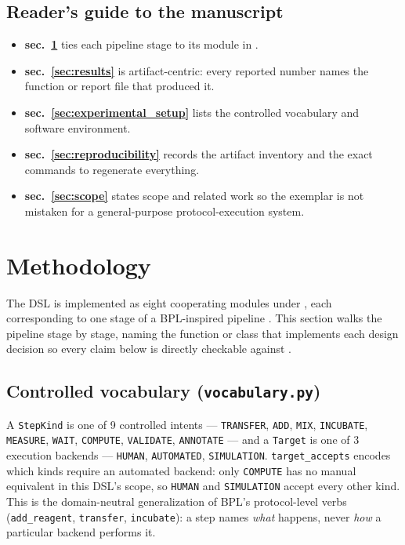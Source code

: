 \documentclass[
  english,
]{article}
\providecommand{\tightlist}{%
  \setlength{\itemsep}{0pt}\setlength{\parskip}{0pt}}
\begin{document}
\subsection{Reader's guide to the
manuscript}\label{readers-guide-to-the-manuscript}

\begin{itemize}
\tightlist
\item
  \textbf{sec.~\ref{sec:methodology}} ties each pipeline stage to its
  module in .
\item
  \textbf{sec.~\ref{sec:results}} is artifact-centric: every reported
  number names the function or report file that produced it.
\item
  \textbf{sec.~\ref{sec:experimental_setup}} lists the controlled
  vocabulary and software environment.
\item
  \textbf{sec.~\ref{sec:reproducibility}} records the artifact inventory
  and the exact commands to regenerate everything.
\item
  \textbf{sec.~\ref{sec:scope}} states scope and related work so the
  exemplar is not mistaken for a general-purpose protocol-execution
  system.
\end{itemize}

\newpage

\section{Methodology}\label{sec:methodology}

The DSL is implemented as eight cooperating modules under
, each corresponding to one stage of a
BPL-inspired pipeline \citep{bpl2026}. This section walks the pipeline
stage by stage, naming the function or class that implements each design
decision so every claim below is directly checkable against
.

\subsection{\texorpdfstring{Controlled vocabulary
(\texttt{vocabulary.py})}{Controlled vocabulary (vocabulary.py)}}\label{controlled-vocabulary-vocabulary.py}

A \texttt{StepKind} is one of 9 controlled intents ---
\texttt{TRANSFER}, \texttt{ADD}, \texttt{MIX}, \texttt{INCUBATE},
\texttt{MEASURE}, \texttt{WAIT}, \texttt{COMPUTE}, \texttt{VALIDATE},
\texttt{ANNOTATE} --- and a \texttt{Target} is one of 3 execution
backends --- \texttt{HUMAN}, \texttt{AUTOMATED}, \texttt{SIMULATION}.
\texttt{target\_accepts} encodes which kinds require an automated
backend: only \texttt{COMPUTE} has no manual equivalent in this DSL's
scope, so \texttt{HUMAN} and \texttt{SIMULATION} accept every other
kind. This is the domain-neutral generalization of BPL's protocol-level
verbs (\texttt{add\_reagent}, \texttt{transfer}, \texttt{incubate}): a
step names \emph{what} happens, never \emph{how} a particular backend
performs it.
\end{document}

